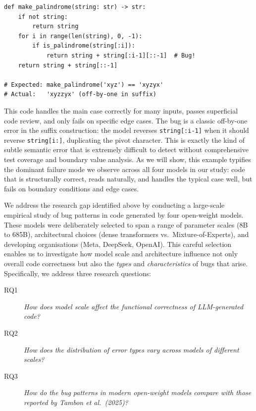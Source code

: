 \documentclass[smallextended]{svjour3}
\begin{document}
\begin{lstlisting}[caption={Example: Missing Corner Case in HumanEval/10 (Llama~3.3~70B). The model correctly identifies the longest palindromic prefix but constructs the wrong suffix for the input \texttt{'xyz'}, producing \texttt{'xyzzyx'} instead of the expected \texttt{'xyzyx'}.},label=lst:intro_bug]
def make_palindrome(string: str) -> str:
    if not string:
        return string
    for i in range(len(string), 0, -1):
        if is_palindrome(string[:i]):
            return string + string[:i-1][::-1]  # Bug!
    return string + string[::-1]

# Expected: make_palindrome('xyz') == 'xyzyx'
# Actual:   'xyzzyx' (off-by-one in suffix)
\end{lstlisting}

This code handles the main case correctly for many inputs, passes superficial code review, and only fails on specific edge cases. The bug is a classic off-by-one error in the suffix construction: the model reverses \texttt{string[:i-1]} when it should reverse \texttt{string[i:]}, duplicating the pivot character. This is exactly the kind of subtle semantic error that is extremely difficult to detect without comprehensive test coverage and boundary value analysis. As we will show, this example typifies the dominant failure mode we observe across all four models in our study: code that is structurally correct, reads naturally, and handles the typical case well, but fails on boundary conditions and edge cases.

We address the research gap identified above by conducting a large-scale empirical study of bug patterns in code generated by four open-weight models. These models were deliberately selected to span a range of parameter scales (8B to 685B), architectural choices (dense transformers vs.\ Mixture-of-Experts), and developing organisations (Meta, DeepSeek, OpenAI). This careful selection enables us to investigate how model scale and architecture influence not only overall code correctness but also the \emph{types} and \emph{characteristics} of bugs that arise. Specifically, we address three research questions:

\begin{description}
    \item[RQ1] \emph{How does model scale affect the functional correctness of LLM-generated code?}
    \item[RQ2] \emph{How does the distribution of error types vary across models of different scales?}
    \item[RQ3] \emph{How do the bug patterns in modern open-weight models compare with those reported by Tambon et al.\ (2025)?}
\end{description}
\end{document}

